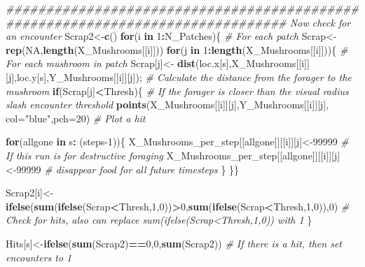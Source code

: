 \documentclass[
]{article}
\newenvironment{Shaded}{\begin{snugshade}}{\end{snugshade}}
\newcommand{\CommentTok}[1]{\textcolor[rgb]{0.56,0.35,0.01}{\textit{#1}}}
\newcommand{\ControlFlowTok}[1]{\textcolor[rgb]{0.13,0.29,0.53}{\textbf{#1}}}
\newcommand{\DataTypeTok}[1]{\textcolor[rgb]{0.13,0.29,0.53}{#1}}
\newcommand{\DecValTok}[1]{\textcolor[rgb]{0.00,0.00,0.81}{#1}}
\newcommand{\KeywordTok}[1]{\textcolor[rgb]{0.13,0.29,0.53}{\textbf{#1}}}
\newcommand{\NormalTok}[1]{#1}
\newcommand{\OperatorTok}[1]{\textcolor[rgb]{0.81,0.36,0.00}{\textbf{#1}}}
\newcommand{\OtherTok}[1]{\textcolor[rgb]{0.56,0.35,0.01}{#1}}
\newcommand{\StringTok}[1]{\textcolor[rgb]{0.31,0.60,0.02}{#1}}
\begin{document}
\begin{Shaded}
\begin{Highlighting}[]
{\CommentTok{############################################################################### Now check for an encounter }
\NormalTok{ Scrap2<-}\KeywordTok{c}\NormalTok{()}
 \ControlFlowTok{for}\NormalTok{(i }\ControlFlowTok{in} \DecValTok{1}\OperatorTok{:}\NormalTok{N_Patches)\{                                                         }\CommentTok{# For each patch}
\NormalTok{  Scrap<-}\KeywordTok{rep}\NormalTok{(}\OtherTok{NA}\NormalTok{,}\KeywordTok{length}\NormalTok{(X_Mushrooms[[i]]))}
 \ControlFlowTok{for}\NormalTok{(j }\ControlFlowTok{in} \DecValTok{1}\OperatorTok{:}\KeywordTok{length}\NormalTok{(X_Mushrooms[[i]]))\{                                          }\CommentTok{# For each mushroom in patch}
\NormalTok{ Scrap[j]<-}\StringTok{ }\KeywordTok{dist}\NormalTok{(loc.x[s],X_Mushrooms[[i]][j],loc.y[s],Y_Mushrooms[[i]][j]);    }\CommentTok{# Calculate the distance from the forager to the mushroom}
 \ControlFlowTok{if}\NormalTok{(Scrap[j]}\OperatorTok{<}\NormalTok{Thresh)\{                                                           }\CommentTok{# If the forager is closer than the visual radius slash encounter threshold}
 \KeywordTok{points}\NormalTok{(X_Mushrooms[[i]][j],Y_Mushrooms[[i]][j], }\DataTypeTok{col=}\StringTok{"blue"}\NormalTok{,}\DataTypeTok{pch=}\DecValTok{20}\NormalTok{)             }\CommentTok{# Plot a hit}

       \ControlFlowTok{for}\NormalTok{(allgone }\ControlFlowTok{in}\NormalTok{ s}\OperatorTok{:}\StringTok{ }\NormalTok{(steps}\DecValTok{-1}\NormalTok{))\{}
\NormalTok{       X_Mushrooms_per_step[[allgone]][[i]][j]<-}\DecValTok{99999}                           \CommentTok{# If this run is for destructive foraging}
\NormalTok{       X_Mushrooms_per_step[[allgone]][[i]][j]<-}\DecValTok{99999}                           \CommentTok{# disappear food for all future timesteps}
\NormalTok{      \}}
\NormalTok{ \}\}}
 
\NormalTok{ Scrap2[i]<-}\StringTok{ }\KeywordTok{ifelse}\NormalTok{(}\KeywordTok{sum}\NormalTok{(}\KeywordTok{ifelse}\NormalTok{(Scrap}\OperatorTok{<}\NormalTok{Thresh,}\DecValTok{1}\NormalTok{,}\DecValTok{0}\NormalTok{))}\OperatorTok{>}\DecValTok{0}\NormalTok{,}\KeywordTok{sum}\NormalTok{(}\KeywordTok{ifelse}\NormalTok{(Scrap}\OperatorTok{<}\NormalTok{Thresh,}\DecValTok{1}\NormalTok{,}\DecValTok{0}\NormalTok{)),}\DecValTok{0}\NormalTok{)      }\CommentTok{# Check for hits, also can replace sum(ifelse(Scrap<Thresh,1,0)) with 1}
\NormalTok{ \}}
 
\NormalTok{ Hits[s]<-}\KeywordTok{ifelse}\NormalTok{(}\KeywordTok{sum}\NormalTok{(Scrap2)}\OperatorTok{==}\DecValTok{0}\NormalTok{,}\DecValTok{0}\NormalTok{,}\KeywordTok{sum}\NormalTok{(Scrap2))                                            }\CommentTok{# If there is a hit, then set encounters to 1}
  
}
\end{Highlighting}
\end{Shaded}
\end{document}
